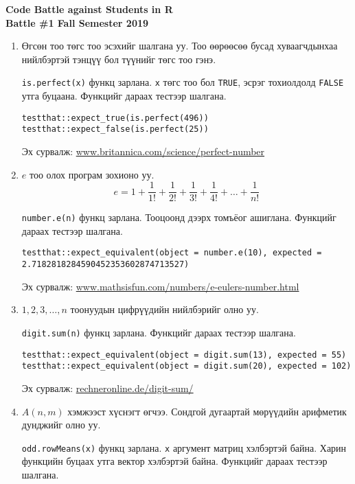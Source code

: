 \documentclass[11pt]{letter}
\begin{document}
\begin{center}
\bfseries
\Large Code Battle against Students in R \\
\large Battle \#1 Fall Semester 2019
\end{center}
\begin{enumerate}
\item Өгсөн тоо төгс тоо эсэхийг шалгана уу. Тоо өөрөөсөө бусад хуваагчдынхаа нийлбэртэй тэнцүү бол түүнийг төгс тоо гэнэ.
\par
\lstinline[otherkeywords={is.perfect}]|is.perfect(x)| функц зарлана. \lstinline|x| төгс тоо бол \lstinline|TRUE|, эсрэг тохиолдолд \lstinline|FALSE| утга буцаана. Функцийг дараах тестээр шалгана.
\begin{lstlisting}[otherkeywords={is.perfect,expect_true,expect_false}]
testthat::expect_true(is.perfect(496))
testthat::expect_false(is.perfect(25))
\end{lstlisting}
Эх сурвалж: \href{https://www.britannica.com/science/perfect-number}{www.britannica.com/science/perfect-number}
\item $e$ тоо олох програм зохионо уу. $$e=1+\frac{1}{1!}+\frac{1}{2!}+\frac{1}{3!}+\frac{1}{4!}+\ldots+\frac{1}{n!}$$
\par
\lstinline[otherkeywords={number.e}]|number.e(n)| функц зарлана. Тооцоонд дээрх томъёог ашиглана. Функцийг дараах тестээр шалгана.
\begin{lstlisting}[otherkeywords={number.e,expect_equivalent}]
testthat::expect_equivalent(object = number.e(10), expected = 2.7182818284590452353602874713527)
\end{lstlisting}
Эх сурвалж: \href{https://www.mathsisfun.com/numbers/e-eulers-number.html}{www.mathsisfun.com/numbers/e-eulers-number.html}
\item $1,2,3,\ldots,n$ тоонуудын цифрүүдийн нийлбэрийг олно уу.
\par
\lstinline[otherkeywords={digit.sum}]|digit.sum(n)| функц зарлана. Функцийг дараах тестээр шалгана.
\begin{lstlisting}[otherkeywords={digit.sum,expect_equivalent}]
testthat::expect_equivalent(object = digit.sum(13), expected = 55)
testthat::expect_equivalent(object = digit.sum(20), expected = 102)
\end{lstlisting}
Эх сурвалж: \href{https://rechneronline.de/digit-sum/}{rechneronline.de/digit-sum/}
\item $A(n,m)$ хэмжээст хүснэгт өгчээ. Сондгой дугаартай мөрүүдийн арифметик дунджийг олно уу.
\par
\lstinline[otherkeywords={odd.rowMeans}]|odd.rowMeans(x)| функц зарлана. \lstinline|x| аргумент матриц хэлбэртэй байна. Харин функцийн буцаах утга вектор хэлбэртэй байна. Функцийг дараах тестээр шалгана.

\end{enumerate}
\end{document}
